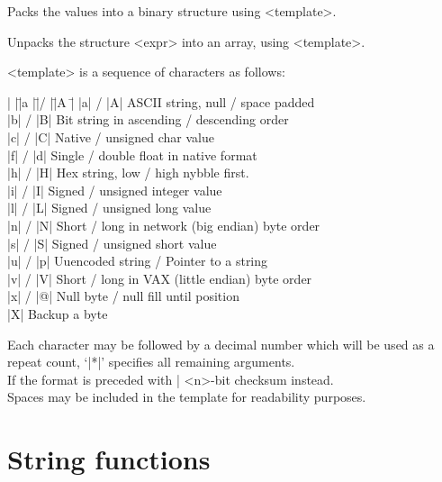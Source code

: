 \documentclass{refbase}
\begin{document}
\begin{enum}{1cm}

Packs the values into a binary structure using <template>.

Unpacks the structure <expr> into an array, using <template>.

<template> is a sequence of characters as follows:

\begin{tabbing}
|  |\=|a |\=|/ |\=|A  |\= \kill
  \> |a| \> / \> |A| \> ASCII string, null / space padded \\
  \> |b| \> / \> |B| \> Bit string in ascending / descending order \\
  \> |c| \> / \> |C| \> Native / unsigned char value \\
  \> |f| \> / \> |d| \> Single / double float in native format \\
  \> |h| \> / \> |H| \> Hex string, low / high nybble first. \\
  \> |i| \> / \> |I| \> Signed / unsigned integer value \\
  \> |l| \> / \> |L| \> Signed / unsigned long value \\
  \> |n| \> / \> |N| \> Short / long in network (big endian) byte order \\
  \> |s| \> / \> |S| \> Signed / unsigned short value \\
  \> |u| \> / \> |p| \> Uuencoded string / Pointer to a string \\
  \> |v| \> / \> |V| \> Short / long in VAX (little endian) byte order \\
  \> |x| \> / \> |@| \> Null byte / null fill until position \\
  \> |X| \>   \>     \> Backup a byte
\end{tabbing}

Each character may be followed by a decimal number which will be used
as a repeat count, `|*|' specifies all remaining arguments. \\
If the format is preceded with |%
<n>-bit checksum instead. \\
Spaces may be included in the template for readability purposes.

\end{enum}


\section{String functions} 
\end{document}
